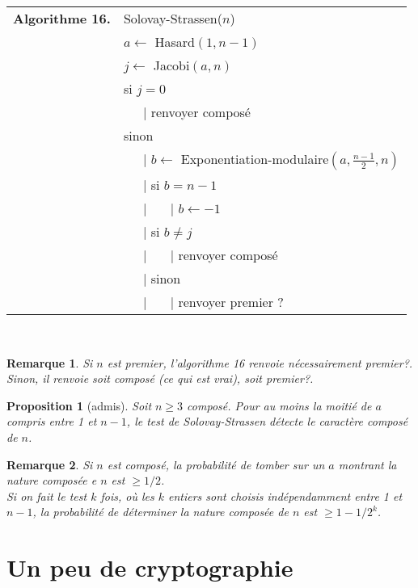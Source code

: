 \documentclass[12pt]{report}
\newtheorem*{rem}{Remarque}
\newtheorem{Prop}[thm]{Proposition}
\begin{document}
\begin{tabular}{ll}
\textbf{Algorithme 16.} & Solovay-Strassen($n$)\\
           & $a \leftarrow$ Hasard$(1,n-1)$  \\
           & $j \leftarrow$ Jacobi$(a,n)$ \\
           &  si $j=0$  \\
           & \ \ \ {\rm |} renvoyer composé \\
           &  sinon  \\
           & \ \ \ {\rm |}  $b \leftarrow $ Exponentiation-modulaire$(a,\tfrac{n-1}{2},n)$ \\
           & \ \ \ {\rm |} si $b=n-1$ \\
           & \ \ \ {\rm |} \ \ \ {\rm |} $b \leftarrow -1$ \\
           & \ \ \ {\rm |} si $b\neq j$\\
           &   \ \ \ {\rm |} \ \ \ {\rm |} renvoyer composé \\           
           & \ \ \ {\rm |} sinon \\
           & \ \ \ {\rm |} \ \ \ {\rm |} renvoyer premier ?
\end{tabular}\\

\begin{rem}
Si $n$ est premier, l'algorithme 16 renvoie nécessairement premier?. Sinon, il renvoie soit composé (ce qui est vrai), soit premier?. 
\end{rem}


\begin{Prop}[admis]
Soit $n \geq 3$ composé. Pour au moins la moitié de $a$ compris entre 1 et $n-1$, le test de Solovay-Strassen détecte le caractère composé de $n$.
\end{Prop}


\begin{rem}
Si $n$ est composé, la probabilité de tomber sur un $a$ montrant la nature composée e $n$ est $\geq 1/2$. \\
Si on fait le test $k$ fois, où les $k$ entiers sont choisis indépendamment entre 1 et $n-1$, la probabilité de déterminer la nature composée de $n$ est $\geq 1-1/2^k$.
\end{rem}


\chapter{Un peu de cryptographie}
\end{document}
